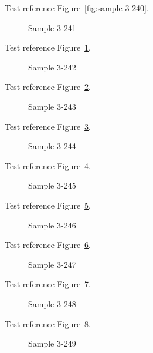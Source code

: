 Test reference Figure~\ref{fig:sample-3-240}.

\begin{figure}[tbhp]
\caption{Sample 3-241}
\label{fig:sample-3-241}
\end{figure}

Test reference Figure~\ref{fig:sample-3-241}.

\begin{figure}[tbhp]
\caption{Sample 3-242}
\label{fig:sample-3-242}
\end{figure}

Test reference Figure~\ref{fig:sample-3-242}.

\begin{figure}[tbhp]
\caption{Sample 3-243}
\label{fig:sample-3-243}
\end{figure}

Test reference Figure~\ref{fig:sample-3-243}.

\begin{figure}[tbhp]
\caption{Sample 3-244}
\label{fig:sample-3-244}
\end{figure}

Test reference Figure~\ref{fig:sample-3-244}.

\begin{figure}[tbhp]
\caption{Sample 3-245}
\label{fig:sample-3-245}
\end{figure}

Test reference Figure~\ref{fig:sample-3-245}.

\begin{figure}[tbhp]
\caption{Sample 3-246}
\label{fig:sample-3-246}
\end{figure}

Test reference Figure~\ref{fig:sample-3-246}.

\begin{figure}[tbhp]
\caption{Sample 3-247}
\label{fig:sample-3-247}
\end{figure}

Test reference Figure~\ref{fig:sample-3-247}.

\begin{figure}[tbhp]
\caption{Sample 3-248}
\label{fig:sample-3-248}
\end{figure}

Test reference Figure~\ref{fig:sample-3-248}.

\begin{figure}[tbhp]
\caption{Sample 3-249}
\label{fig:sample-3-249}
\end{figure}

